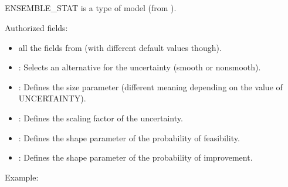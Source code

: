 \documentclass[letterpaper,10pt,english]{sphinxmanual}
\begin{document}
\subsection{}
\label{\detokenize{SgteLib:ensemble-stat}}\label{\detokenize{SgteLib:id11}}
\begin{DUlineblock}{0em}
\item[] ENSEMBLE\_STAT is a type of model (from ).
\item[] Authorized fields:
\end{DUlineblock}
\begin{itemize}
\item {} 
\sphinxAtStartPar
all the fields from {\hyperref[\detokenize{SgteLib:ensemble}]{}} (with different default values though).

\item {} 
\sphinxAtStartPar
{\hyperref[\detokenize{SgteLib:uncertainty}]{}}: Selects an alternative for the uncertainty (smooth or nonsmooth).

\item {} 
\sphinxAtStartPar
{\hyperref[\detokenize{SgteLib:size-param}]{}}: Defines the size parameter (different meaning depending on the value of UNCERTAINTY).

\item {} 
\sphinxAtStartPar
{\hyperref[\detokenize{SgteLib:sigma-mult}]{}}: Defines the scaling factor of the uncertainty.

\item {} 
\sphinxAtStartPar
{\hyperref[\detokenize{SgteLib:lambda-p}]{}}: Defines the shape parameter of the probability of feasibility.

\item {} 
\sphinxAtStartPar
{\hyperref[\detokenize{SgteLib:lambda-pi}]{}}: Defines the shape parameter of the probability of improvement.

\end{itemize}

\begin{DUlineblock}{0em}
\item[] Example:
\item[] 
\end{DUlineblock}
\end{document}
